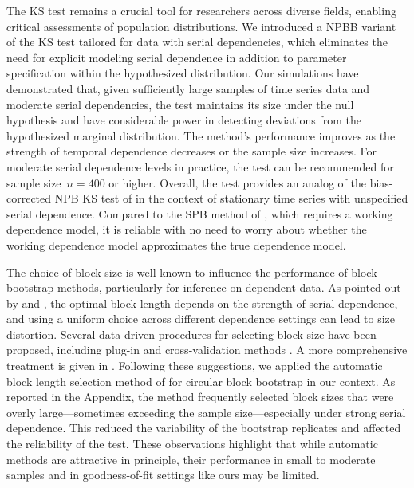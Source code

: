 \documentclass[12pt]{article}
\begin{document}
The KS test remains a crucial tool for researchers across diverse fields,
enabling critical assessments of population distributions. We introduced a
NPBB variant of the KS test tailored for data with
serial dependencies, which eliminates the need for explicit modeling serial
dependence in addition to parameter specification within the hypothesized
distribution. Our simulations have demonstrated that, given
sufficiently large samples of time series data and moderate serial dependencies,
the test maintains its size under the null hypothesis and have considerable
power in detecting deviations from the hypothesized marginal distribution. The
method's performance improves as the strength of temporal dependence decreases
or the sample size increases. For moderate serial dependence levels in practice,
the test can be recommended for sample size~$n = 400$ or higher.
Overall, the test provides an analog of the bias-corrected NPB KS test of
\citet{babu2004goodness} in the context of stationary time
series with unspecified serial dependence. Compared to the SPB method
of \citet{zeimbekakis2022misuses}, which requires a working dependence model, it
is reliable with no need to worry about whether the working dependence
model approximates the true dependence model.


The choice of block size is well known to influence the performance of
block bootstrap methods, particularly for inference on dependent
data. As pointed out by \citet{hall1995blocking} and
\citet{lahiri1999theoretical}, the optimal block length depends on the
strength of serial dependence, and using a uniform choice across
different dependence settings can lead to size distortion. Several
data-driven procedures for selecting block size have been proposed,
including plug-in and cross-validation methods
\citep{buhlmann2002bootstraps, politis2004automatic}. A more
comprehensive treatment is given in
\citet{lahiri2013resampling}. Following these suggestions, we applied
the automatic block length selection method of
\citet{politis2004automatic} for circular block bootstrap in our
context. As reported in the Appendix, the method frequently selected
block sizes that were overly large—sometimes exceeding the sample
size—especially under strong serial dependence. This reduced the
variability of the bootstrap replicates and affected the reliability
of the test. These observations highlight that while automatic methods
are attractive in principle, their performance in small to moderate
samples and in goodness-of-fit settings like ours may be limited.
\end{document}
